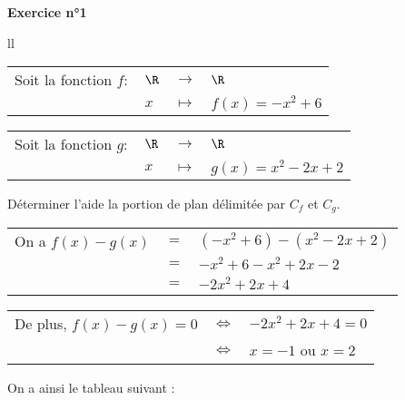 \textbf{Exercice n°1} \\

\begin{tabular}{ll}
\begin{minipage}{8cm}

\begin{tabular}{llll}
\hspace{-.3cm} Soit la fonction $f:$ & $\R$ & $\longrightarrow$ & $\R$ \\
& $x$ &  $\longmapsto$ & $f(x) = -x^2 + 6$ \\
\end{tabular}

\vspace*{.3cm}

\begin{tabular}{llll}
\hspace{-.3cm} Soit la fonction $g:$ & $\R$ & $\longrightarrow$ & $\R$ \\
& $x$ &  $\longmapsto$ & $g(x) = x^2 - 2x + 2$ \\
\end{tabular}

\vspace*{.3cm}

Déterminer l'aide la portion de plan délimitée par $C_f$ et $C_g$. \\

\vspace*{.5cm}

\begin{tabular}{lll}
\hspace{-.3cm} On a $f(x) - g(x)$ & $ = $ & $\left(-x^2 + 6\right) - \left(x^2 - 2x + 2\right)$ \\
& $=$ & $-x^2 + 6 - x^2 + 2x - 2$ \\
& $=$ & $-2x^2 + 2x + 4$ \\
\end{tabular}


\vspace*{.3cm}

\begin{tabular}{lll}
\hspace*{-.3cm} De plus, $f(x) - g(x) = 0$ & $\Longleftrightarrow$ & $-2x^2 + 2x + 4 = 0$ \\
& $\Longleftrightarrow$ & $x = -1$ ou $x = 2$ \\
\end{tabular}

\vspace*{.3cm}

On a ainsi le tableau suivant : \\


\end{minipage}
\end{tabular}
